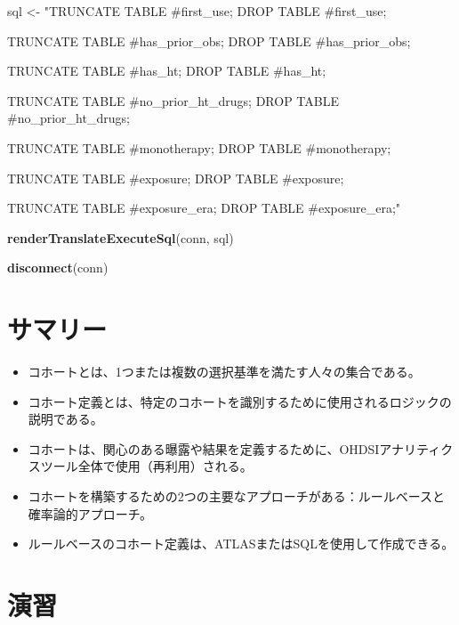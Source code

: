 \documentclass[
  11pt]{book}
\makeatletter
\newenvironment{Shaded}{\begin{snugshade}}{\end{snugshade}}
\newcommand{\FunctionTok}[1]{\textcolor[rgb]{0.13,0.29,0.53}{\textbf{#1}}}
\newcommand{\NormalTok}[1]{#1}
\newcommand{\OtherTok}[1]{\textcolor[rgb]{0.56,0.35,0.01}{#1}}
\newcommand{\StringTok}[1]{\textcolor[rgb]{0.31,0.60,0.02}{#1}}
\newenvironment{kframe}{%
\medskip{}
\setlength{\fboxsep}{.8em}
 \def\at@end@of@kframe{}%
 \ifinner\ifhmode%
  \def\at@end@of@kframe{\end{minipage}}%
  \begin{minipage}{\columnwidth}%
 \fi\fi%
 \def\FrameCommand##1{\hskip\@totalleftmargin \hskip-\fboxsep
 \colorbox{myShadeColor}{##1}\hskip-\fboxsep
     \hskip-\linewidth \hskip-\@totalleftmargin \hskip\columnwidth}%
 \MakeFramed {\advance\hsize-\width
   \@totalleftmargin\z@ \linewidth\hsize
   \@setminipage}}%
 {\par\unskip\endMakeFramed%
 \at@end@of@kframe}
\newenvironment{rmdblock}[1]
  {
  \begin{itemize}
  \renewcommand{\labelitemi}{
    \raisebox{-.7\height}[0pt][0pt]{
      {\setkeys{Gin}{width=3em,keepaspectratio}\texttt{[image: images/\#1]}}
    }
  }
  \setlength{\fboxsep}{1em}
  \begin{kframe}
  \item
  }
  {
  \end{kframe}
  \end{itemize}
  }
\newenvironment{rmdsummary}
  {\begin{rmdblock}{summary}}
  {\end{rmdblock}}
\theoremstyle{definition}
\theoremstyle{definition}
\theoremstyle{definition}
\theoremstyle{definition}
\theoremstyle{remark}
\makeatother
\begin{document}
\begin{Shaded}
\begin{Highlighting}[]
\NormalTok{sql }\OtherTok{\textless{}{-}} \StringTok{"TRUNCATE TABLE \#first\_use;}
\StringTok{DROP TABLE \#first\_use;}

\StringTok{TRUNCATE TABLE \#has\_prior\_obs;}
\StringTok{DROP TABLE \#has\_prior\_obs;}

\StringTok{TRUNCATE TABLE \#has\_ht;}
\StringTok{DROP TABLE \#has\_ht;}

\StringTok{TRUNCATE TABLE \#no\_prior\_ht\_drugs;}
\StringTok{DROP TABLE \#no\_prior\_ht\_drugs;}

\StringTok{TRUNCATE TABLE \#monotherapy;}
\StringTok{DROP TABLE \#monotherapy;}

\StringTok{TRUNCATE TABLE \#exposure;}
\StringTok{DROP TABLE \#exposure;}

\StringTok{TRUNCATE TABLE \#exposure\_era;}
\StringTok{DROP TABLE \#exposure\_era;"}

\FunctionTok{renderTranslateExecuteSql}\NormalTok{(conn, sql)}

\FunctionTok{disconnect}\NormalTok{(conn)}
\end{Highlighting}
\end{Shaded}

\section{サマリー}\label{ux30b5ux30deux30eaux30fc}

\begin{rmdsummary}
\begin{itemize}
\item
  コホートとは、1つまたは複数の選択基準を満たす人々の集合である。
\item
  コホート定義とは、特定のコホートを識別するために使用されるロジックの説明である。
\item
  コホートは、関心のある曝露や結果を定義するために、OHDSIアナリティクスツール全体で使用（再利用）される。
\item
  コホートを構築するための2つの主要なアプローチがある：ルールベースと確率論的アプローチ。
\item
  ルールベースのコホート定義は、ATLASまたはSQLを使用して作成できる。
\end{itemize}
\end{rmdsummary}

\section{演習}\label{ux6f14ux7fd2-3}
\end{document}
